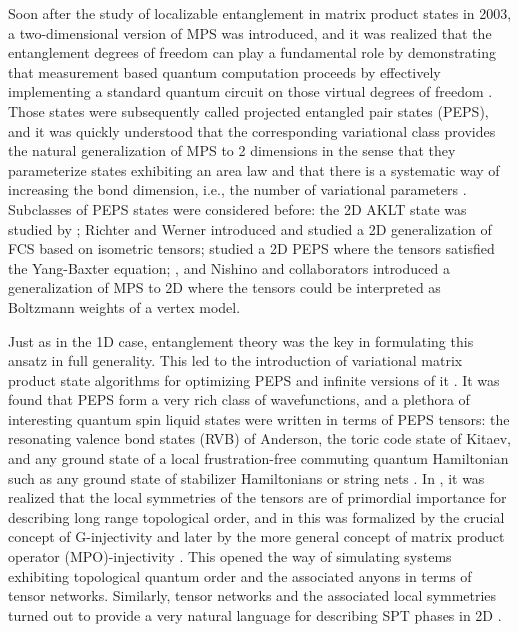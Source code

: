 \documentclass[rmp,aps,reprint,superscriptaddress,nobalancelastpage]{revtex4-1}
\begin{document}
Soon after the study of localizable entanglement in matrix product states
in 2003, a two-dimensional version of MPS was introduced, and  it was
realized that the entanglement degrees of freedom can play a fundamental
role by demonstrating that measurement based quantum computation
\cite{raussendorf:cluster-short} proceeds by effectively implementing a standard quantum circuit on those virtual degrees of freedom \cite{verstraete:mbc-peps}. Those states were subsequently called projected entangled pair states (PEPS), and it was quickly understood that the corresponding  variational class provides the natural generalization of MPS to 2 dimensions in the sense that they parameterize states exhibiting an area law and that there is a systematic way of increasing the bond dimension, i.e., the number of variational parameters \cite{verstraete:2D-dmrg}. Subclasses of PEPS states were considered before: the 2D AKLT state was studied by \citet{affleck:aklt-cmp};
Richter and Werner \cite{richter:phd-contour-correlated-states} introduced and studied a 2D generalization of FCS based on isometric tensors;
\citet*{niggemann1997quantum} studied a 2D PEPS where the tensors satisfied the Yang-Baxter equation;
\citet{sierra1998density}, and Nishino and collaborators \cite{nishino:tps,Nishino2:tps} introduced a generalization of MPS to 2D where the tensors could be interpreted as Boltzmann weights of a vertex model.

Just as in the 1D case, entanglement theory was the key in  formulating this ansatz in full generality. This led to the introduction of variational matrix product state algorithms for optimizing PEPS \cite{verstraete:2D-dmrg} and infinite versions of it \cite{jordan:iPEPS}.  It was found that PEPS form a very rich class of wavefunctions, and a plethora of interesting quantum spin liquid states were written in terms of PEPS tensors: the resonating valence bond states (RVB) of Anderson, the toric code state of Kitaev, and any ground state of a local frustration-free commuting quantum Hamiltonian \cite{verstraete:comp-power-of-peps} such as any ground state of stabilizer Hamiltonians \cite{verstraete:mbc-peps} or string nets \cite{buerschaper:stringnet-peps}. In \cite{gu:TERG,gu2009tensor}, it was realized that the local symmetries of the tensors are of primordial importance for describing long range topological order, and in \cite{schuch:mps-phases} this was formalized by the crucial concept of G-injectivity and later by the more general concept of matrix product operator (MPO)-injectivity \cite{sahinoglu:mpo-injectivity,bultinck:mpo-anyons}. This opened the way of simulating systems exhibiting topological quantum order and the associated anyons in terms of tensor networks. Similarly, tensor networks and the associated local symmetries turned out to provide a very natural language for describing SPT phases in 2D \cite{chen:spt-order-and-cohomology,buerschaper:twisted-injectivity,williamson:mpo-spt}.
\end{document}
